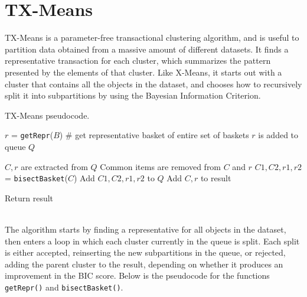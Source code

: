 \section{TX-Means}

TX-Means is a parameter-free transactional clustering algorithm, and is useful to partition data obtained from a massive amount of different datasets. It finds a representative transaction for each cluster, which summarizes the pattern presented by the elements of that cluster. Like X-Means, it starts out with a cluster that contains all the objects in the dataset, and chooses how to recursively split it into subpartitions by using the Bayesian Information Criterion.
\begin{algorithm}
\caption{TX-Means pseudocode.}
\begin{algorithmic}[1]
    \State $r$ = \texttt{getRepr}($B$) \# get representative basket of entire set of baskets
    \State $r$ is added to queue $Q$

        \State $C, r$ are extracted from $Q$
        \State Common items are removed from $C$ and $r$
        \State $C1,C2,r1,r2$ = \texttt{bisectBasket}($C$)
            \State Add $C1,C2,r1,r2$ to $Q$
        \Else
            \State Add $C, r$ to result 
        \EndIf
    \EndWhile

    \State Return result
\end{algorithmic}
\end{algorithm} \\
The algorithm starts by finding a representative for all objects in the dataset, then enters a loop in which each cluster currently in the queue is split. Each split is either accepted, reinserting the new subpartitions in the queue, or rejected, adding the parent cluster to the result, depending on whether it produces an improvement in the BIC score. Below is the pseudocode for the functions \texttt{getRepr()} and \texttt{bisectBasket()}.

